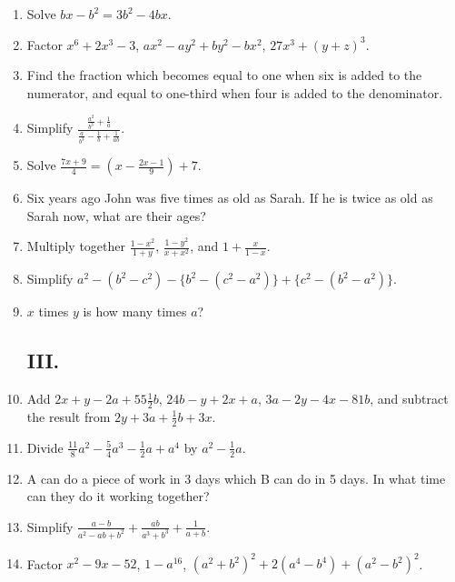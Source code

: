 \documentclass{book}
\begin{document}
\begin{enumerate}
\item Solve $bx-b^{2}=3b^{2}-4bx$.

\item Factor $x^{6}+2x^{3}-3$, $ax^{2}-ay^{2}+by^{2}-bx^{2}$, $27x^3+(y+z)^{3}$.

\item Find the fraction which becomes equal to one when
six is added to the numerator, and equal to one-third when
four is added to the denominator.

\item Simplify $\displaystyle \frac{ \frac{a^2}{b^3} + \frac{1}{a}
}
                   { \frac{a}{b^3} - \frac{1}{b} + \frac{1}{ab} }$.

\item Solve $\displaystyle
\frac{7x+9}{4}=\left(x-\frac{2x-1}{9}\right)+7$.

\item Six years ago John was five times as old as Sarah.
If he is twice as old as Sarah now, what are their ages?

\item Multiply together $\frac{1-x^2}{1+y}$, $\frac{1-y^2}{x+x^2}$, and $1+\frac{x}{1-x}$.

\item Simplify
$a^2 - (b^2-c^2) - \{b^2 - (c^2-a^2)\} + \{c^2 - (b^2-a^2)\}$.

\item $x$ times $y$ is how many times $a$?


\subsection*{III.}

\item Add $2x + y - 2a + 55\frac{1}{2}b$, $24b-y + 2x + a$, $3a -
2y - 4x - 81b$, and subtract the result from $2y + 3a +
\frac{1}{2}b + 3x$.

\item Divide $\frac{11}{8}a^2-\frac{5}{4}a^3-\frac{1}{2}a+a^4$ by $a^2-\frac{1}{2}a$.

\item A can do a piece of work in 3 days which B can do
in 5 days. In what time can they do it working together?

\item Simplify $\displaystyle \frac{a-b}{a^2-ab+b^2}
 + \frac{ab}{a^3+b^3} + \frac{1}{a+b}$.

\item Factor $x^2-9x-52$, $1-a^{16}$, $(a^2 + b^2)^2 + 2(a^4-b^4) + (a^2-b^2)^2$.


\end{enumerate}
\end{document}
